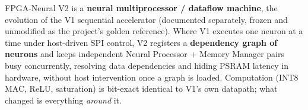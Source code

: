 \thispagestyle{plain}
\noindent
{}

\vspace{6pt}
\noindent
{\small FPGA-Neural V2 is a \textbf{neural multiprocessor / dataflow machine},
the evolution of the V1 sequential accelerator (documented separately, frozen
and unmodified as the project's golden reference). Where V1 executes one
neuron at a time under host-driven SPI control, V2 registers a
\textbf{dependency graph of neurons} and keeps  independent
Neural Processor $+$ Memory Manager pairs busy concurrently, resolving data
dependencies and hiding PSRAM latency in hardware, without host
intervention once a graph is loaded. Computation (INT8 MAC, ReLU,
saturation) is bit-exact identical to V1's own datapath; what changed is
everything \emph{around} it.}

